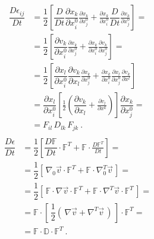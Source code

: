 \documentclass[letterpaper,10pt,english]{jupyterBook}
\begin{document}
\begin{equation*}
\begin{split}\begin{aligned}
  \dfrac{D \epsilon_{ij}}{D t}
  & = \dfrac{1}{2} \left[ \dfrac{D}{Dt}\dfrac{\partial x_k}{\partial x_i^0} \frac{\partial x_k}{\partial x^0_j} + \frac{\partial x_k}{\partial x^0_i} \dfrac{D}{Dt} \frac{\partial x_k}{\partial x^0_j}  \right] = \\
  & = \dfrac{1}{2} \left[ \dfrac{\partial v_k}{\partial x_i^0} \frac{\partial x_k}{\partial x^0_j} + \frac{\partial x_k}{\partial x^0_i}  \frac{\partial v_k}{\partial x^0_j}  \right] = \\
  & = \dfrac{1}{2} \left[ \dfrac{\partial x_l}{\partial x^0_i} \dfrac{\partial v_k}{\partial x_l} \frac{\partial x_k}{\partial x^0_j} + \frac{\partial x_k}{\partial x^0_i} \frac{\partial x_l}{\partial x^0_j} \frac{\partial v_k}{\partial x^l}  \right]  \\
  & = \dfrac{\partial x_l}{\partial x^0_i} \left[ \frac{1}{2} \left( \dfrac{\partial v_k}{\partial x_l} + \frac{\partial v_l}{\partial x^k} \right) \right] \dfrac{\partial x_k}{\partial x^0_j} = \\
  & = F_{il} \, D_{lk} \, F_{jk} \ .
\end{aligned}\end{split}
\end{equation*}\begin{equation}\label{equation:ch/continuum/kinematics:eq:green-lagrange:dt}
\begin{split}\begin{aligned}
 \dfrac{D \mathbb{\epsilon}}{Dt} 
 & = \dfrac{1}{2} \left[ \dfrac{D \mathbb{F}}{D t} \cdot \mathbb{F}^T + \mathbb{F} \cdot \frac{D \mathbb{F}^T}{D t} \right] = \\
 & = \dfrac{1}{2} \left[ \, \nabla_0 \vec{v} \cdot \mathbb{F}^T + \mathbb{F} \cdot \nabla_0^T \vec{v} \, \right] = \\
 & = \dfrac{1}{2} \left[ \, \mathbb{F} \cdot \nabla \vec{v} \cdot \mathbb{F}^T + \mathbb{F} \cdot \nabla^T \vec{v} \cdot \mathbb{F}^T \, \right] = \\
 & = \mathbb{F} \cdot \left[ \, \dfrac{1}{2} \left( \, \nabla \vec{v} + \nabla^T \vec{v} \, \right) \, \right] \cdot \mathbb{F}^T = \\
 & = \mathbb{F} \cdot \mathbb{D} \cdot \mathbb{F}^T \ .
\end{aligned}\end{split}
\end{equation}
\sphinxstepscope
\end{document}
